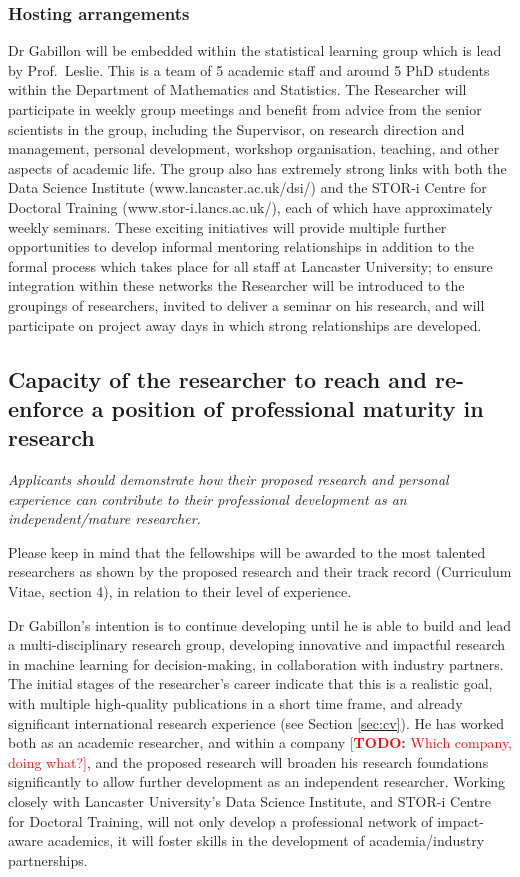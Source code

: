 \documentclass[a4paper,11pt]{article}
\newcommand{\TODO}[1]{{\textcolor{red}{[\textbf{TODO:} #1]}}}
\begin{document}
\subsubsection*{Hosting arrangements}

Dr Gabillon will be embedded within the statistical learning group which is lead by Prof.\ Leslie.  This is a team of 5 academic staff and around 5 PhD students within the Department of Mathematics and Statistics.  The Researcher will participate in weekly group meetings and benefit from advice from the senior scientists in the group, including the Supervisor, on research direction and management, personal development, workshop organisation, teaching, and other aspects of academic life.  The group also has extremely strong links with both the Data Science Institute (www.lancaster.ac.uk/dsi/) and the STOR-i Centre for Doctoral Training (www.stor-i.lancs.ac.uk/), each of which have approximately weekly seminars.  These exciting initiatives will provide multiple further opportunities to develop informal mentoring relationships in addition to the formal process which takes place for all staff at Lancaster University; to ensure integration within these networks the Researcher will be introduced to the groupings of researchers, invited to deliver a seminar on his research, and will participate on project away days in which strong relationships are developed.



\subsection{Capacity of the researcher to reach and re-enforce a position of professional maturity in research}
\label{sec:maturity}

{\em
Applicants should demonstrate how their proposed research and personal experience can contribute to their professional development as an independent/mature researcher.

Please keep in mind that the fellowships will be awarded to the most talented researchers as shown by the proposed research and their track record (Curriculum Vitae, section 4), in relation to their level of experience.
}

Dr Gabillon's intention is to continue developing until he is able to build and lead a multi-disciplinary research group, developing innovative and impactful research in machine learning for decision-making, in collaboration with industry partners.  The initial stages of the researcher's career indicate that this is a realistic goal, with multiple high-quality publications in a short time frame, and already significant international research experience (see Section \ref{sec:cv}).  He has worked both as an academic researcher, and within a company \TODO{Which company, doing what?}, and the proposed research will broaden his research foundations significantly to allow further development as an independent researcher.  Working closely with Lancaster University's Data Science Institute, and STOR-i Centre for Doctoral Training, will not only develop a professional network of impact-aware academics, it will foster skills in the development of academia/industry partnerships.
\end{document}
